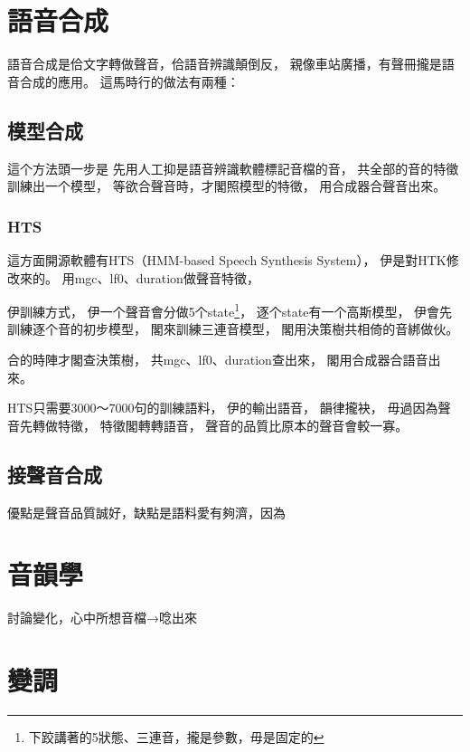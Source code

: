 \documentclass[final,oneside,onecolumn,12pt,a4paper]{book}%
\begin{document}

\section{語音合成}
\label{節：語音合成}
語音合成是佮文字轉做聲音，佮語音辨識顛倒反，
親像車站廣播，有聲冊攏是語音合成的應用。
這馬時行的做法有兩種：

\subsection{模型合成}
\label{小節：模型合成}
這个方法頭一步是
先用人工抑是語音辨識軟體標記音檔的音，
共全部的音的特徵訓練出一个模型，
等欲合聲音時，才閣照模型的特徵，
用合成器合聲音出來。


\subsubsection{HTS}
\label{小節：HTS}
這方面開源軟體有HTS（HMM-based Speech Synthesis System）\cite{HTS網頁}，
伊是對HTK修改來的。
用mgc、lf0、duration做聲音特徵，

伊訓練方式，
伊一个聲音會分做5个state\footnote{下跤講著的5狀態、三連音，攏是參數，毋是固定的}，
逐个state有一个高斯模型，
伊會先訓練逐个音的初步模型，
閣來訓練三連音模型，
閣用決策樹共相倚的音綁做伙。

合的時陣才閣查決策樹，
共mgc、lf0、duration查出來，
閣用合成器合語音出來。

HTS只需要3000～7000句的訓練語料，
伊的輸出語音，
韻律攏袂，
毋過因為聲音先轉做特徵，
特徵閣轉轉語音，
聲音的品質比原本的聲音會較一寡。


\subsection{接聲音合成}
\label{小節：接聲音合成}

優點是聲音品質誠好，缺點是語料愛有夠濟，因為



\section{音韻學}
\label{節：音韻學}
討論變化，心中所想音檔→唸出來



\section{變調}
\label{節：變調}
\end{document}
